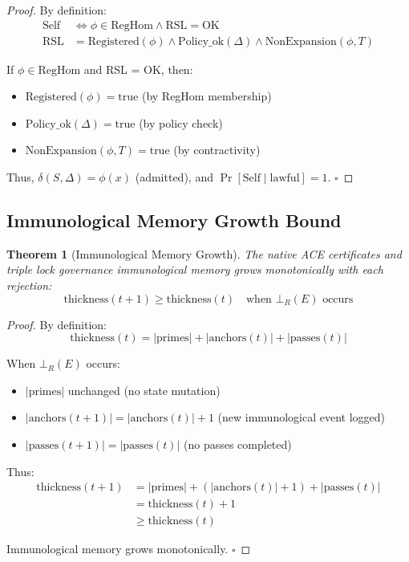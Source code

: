 \documentclass[11pt,a4paper]{article}
\newtheorem{theorem}{Theorem}[section]
\begin{document}
\begin{proof}
By definition:
\begin{align}
\text{Self} &\iff \phi \in \text{RegHom} \land \text{RSL} = \text{OK} \\
\text{RSL} &= \text{Registered}(\phi) \land \text{Policy\_ok}(\Delta) \land \text{NonExpansion}(\phi, T)
\end{align}

If $\phi \in \text{RegHom}$ and RSL = OK, then:
\begin{itemize}
    \item $\text{Registered}(\phi) = \text{true}$ (by RegHom membership)
    \item $\text{Policy\_ok}(\Delta) = \text{true}$ (by policy check)
    \item $\text{NonExpansion}(\phi, T) = \text{true}$ (by contractivity)
\end{itemize}

Thus, $\delta(S, \Delta) = \phi(x)$ (admitted), and $\Pr[\text{Self} \mid \text{lawful}] = 1$. \hfill$\square$
\end{proof}

\subsection{Immunological Memory Growth Bound}

\begin{theorem}[Immunological Memory Growth]\label{thm:memory_growth}
The native ACE certificates and triple lock governance immunological memory grows monotonically with each rejection:
\begin{equation}
\text{thickness}(t+1) \geq \text{thickness}(t) \quad \text{when } \bot_R(E) \text{ occurs}
\end{equation}
\end{theorem}

\begin{proof}
By definition:
\begin{equation}
\text{thickness}(t) = |\text{primes}| + |\text{anchors}(t)| + |\text{passes}(t)|
\end{equation}

When $\bot_R(E)$ occurs:
\begin{itemize}
    \item $|\text{primes}|$ unchanged (no state mutation)
    \item $|\text{anchors}(t+1)| = |\text{anchors}(t)| + 1$ (new immunological event logged)
    \item $|\text{passes}(t+1)| = |\text{passes}(t)|$ (no passes completed)
\end{itemize}

Thus:
\begin{align}
\text{thickness}(t+1) &= |\text{primes}| + (|\text{anchors}(t)| + 1) + |\text{passes}(t)| \\
&= \text{thickness}(t) + 1 \\
&\geq \text{thickness}(t)
\end{align}

Immunological memory grows monotonically. \hfill$\square$
\end{proof}
\end{document}
